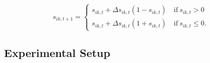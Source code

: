 \documentclass[11pt,letterpaper]{article}
\begin{document}
\begin{equation}
  s_{ik,t+1} = \begin{cases}
                  s_{ik,t} + \Delta s_{ik,t}\left(1 - s_{ik,t}\right) 
                      \quad \mathrm{if}~ s_{ik,t} > 0 \\
                  s_{ik,t} + \Delta s_{ik,t}\left(1 + s_{ik,t}\right)
                      \quad \mathrm{if}~ s_{ik,t} \leq 0.
  \end{cases}
\end{equation}

\subsection{Experimental Setup}
\label{sub:Experimental-Setup}




\setlength{\bibleftmargin}{.125in}
\setlength{\bibindent}{-\bibleftmargin}


\end{document}
